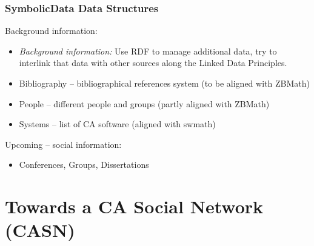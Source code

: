 \documentclass{beamer}
\begin{document}
\begin{frame}\frametitle{SymbolicData Data Structures}
Background information:
\begin{itemize}
\item \emph{Background information:} Use RDF to manage additional data, try to
interlink that data with other sources along the Linked Data Principles.
\item Bibliography -- bibliographical references system (to be aligned with
  ZBMath)
\item People -- different people and groups (partly aligned with ZBMath)
\item Systems -- list of CA software (aligned with swmath) 
\end{itemize}
Upcoming -- social information:
\begin{itemize}
\item Conferences, Groups, Dissertations
\end{itemize}
\end{frame}

\section{Towards a CA Social Network (CASN)}
\end{document}

